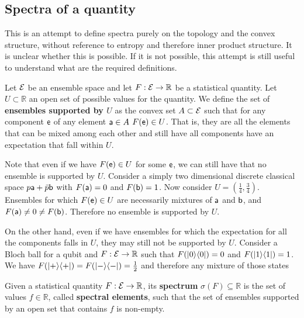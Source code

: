 \subsection{Spectra of a quantity}

This is an attempt to define spectra purely on the topology and the convex structure, without reference to entropy and therefore inner product structure. It is unclear whether this is possible. If it is not possible, this attempt is still useful to understand what are the required definitions.

\begin{defn}
	Let $\Ens$ be an ensemble space and let $F : \Ens \to \mathbb{R}$ be a statistical quantity. Let $U \subset \mathbb{R}$ an open set of possible values for the quantity. We define the set of \textbf{ensembles supported by $U$} as the convex set $A \subset \Ens$ such that for any component $\ens$ of any element $\ens[a] \in A$ $F(\ens) \in U$. That is, they are all the elements that can be mixed among each other and still have all components have an expectation that fall within $U$.
\end{defn}

\begin{remark}
	Note that even if we have $F(\ens) \in U$ for some $\ens$, we can still have that no ensemble is supported by $U$. Consider a simply two dimensional discrete classical space $p\ens[a] + \bar{p} \ens[b]$ with $F(\ens[a]) = 0$ and $F(\ens[b]) = 1$. Now consider $U = \left(\frac{1}{4}, \frac{3}{4} \right)$. Ensembles for which $F(\ens) \in U$ are necessarily mixtures of $\ens[a]$ and $\ens[b]$, and $F(\ens[a])\neq 0 \neq F(\ens[b])$. Therefore no ensemble is supported by $U$.
	
	On the other hand, even if we have ensembles for which the expectation for all the components falls in $U$, they may still not be supported by $U$. Consider a Bloch ball for a qubit and  $F : \Ens \to \mathbb{R}$ such that $F(|0\>\<0|) = 0$ and $F(|1\>\<1|) = 1$. We have $F(|+\>\<+|) = F(|-\>\<-|) = \frac{1}{2}$ and therefore any mixture of those states
\end{remark}

\begin{defn}
	Given a statistical quantity $F : \Ens \to \mathbb{R}$, its \textbf{spectrum} $\sigma(F) \subseteq \mathbb{R}$ is the set of values $f \in \mathbb{R}$, called \textbf{spectral elements}, such that the set of ensembles supported by an open set that contains $f$ is non-empty.
\end{defn}

